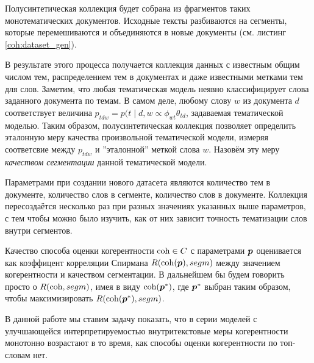 Полусинтетическая коллекция будет собрана из фрагментов таких монотематических документов. Исходные тексты разбиваются на сегменты, которые перемешиваются и объединяются в новые документы (см. листинг \ref{coh:dataset_gen}).


  В результате этого процесса получается коллекция данных с известным общим числом тем, распределением тем в документах и даже известными метками тем для слов. Заметим, что любая тематическая модель неявно классифицирует слова заданного документа по темам. В самом деле, любому слову $w$ из документа $d$ соответствует величина $p_{tdw} = p(t \mid d, w \propto \phi_{wt}\theta_{td}$, задаваемая тематической моделью. Таким образом, полусинтетическая коллекция позволяет определить эталонную меру качества произвольной тематической модели, измеряя соответсвие между $p_{tdw}$ и ''эталонной'' меткой слова $w$. Назовём эту меру \textit{качеством сегментации} данной тематической модели. 
  
  Параметрами при создании нового датасета являются количество тем в документе, количество слов в сегменте, количество слов в документе.  Коллекция пересоздаётся несколько раз при разных значениях указанных выше параметров, с тем чтобы можно было изучить, как от них зависит точность тематизации слов внутри сегментов.


  
  
  Качество способа оценки когерентности $\operatorname{coh} \in C$ с параметрами $\boldsymbol{p}$ оценивается как коэффицент корреляции Спирмана $R(\operatorname{coh}(\boldsymbol{p}), segm)$ между значением когерентности и качеством сегментации. В дальнейшем бы будем говорить просто о $R(\operatorname{coh}, segm)$, имея в виду $\operatorname{coh}(\boldsymbol{p}^*)$, где $\boldsymbol{p}^*$ выбран таким образом, чтобы максимизировать $R(\operatorname{coh}(\boldsymbol{p}^*), segm)$. 
  
  В данной работе мы ставим задачу показать, что в серии моделей с улучшающейся интерпретируемостью внутритекстовые меры когерентности монотонно возрастают в то время, как способы оценки когерентности по топ-словам нет.
  
